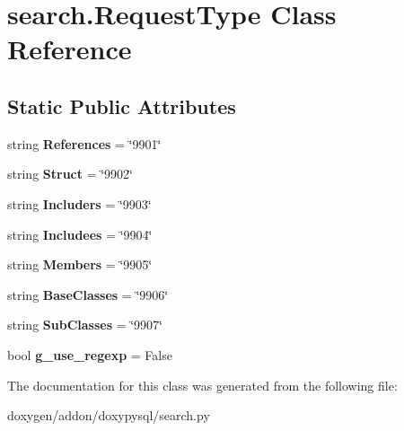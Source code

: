 \hypertarget{classsearch_1_1_request_type}{}\section{search.\+Request\+Type Class Reference}
\label{classsearch_1_1_request_type}
\subsection*{Static Public Attributes}
\begin{DoxyCompactItemize}
\item 
\mbox{\label{classsearch_1_1_request_type_ac366ecff13e29a1e9de0626e72a10e15}} 
string {\bfseries References} = \char`\"{}9901\char`\"{}
\item 
\mbox{\label{classsearch_1_1_request_type_a6db1aa20748192d736732e4f19b3a6f2}} 
string {\bfseries Struct} = \char`\"{}9902\char`\"{}
\item 
\mbox{\label{classsearch_1_1_request_type_adc2057e46c1a24a5fdc5f6b55e06b5e6}} 
string {\bfseries Includers} = \char`\"{}9903\char`\"{}
\item 
\mbox{\label{classsearch_1_1_request_type_a33ea51680ef2f9b512541dd64a2384b2}} 
string {\bfseries Includees} = \char`\"{}9904\char`\"{}
\item 
\mbox{\label{classsearch_1_1_request_type_a610b07848237d0ae74a6d2df7876db02}} 
string {\bfseries Members} = \char`\"{}9905\char`\"{}
\item 
\mbox{\label{classsearch_1_1_request_type_afff38a669aa416f1dbed3d5e892e59ff}} 
string {\bfseries Base\+Classes} = \char`\"{}9906\char`\"{}
\item 
\mbox{\label{classsearch_1_1_request_type_a9bab5f69fb129e5a373ee06284ce615b}} 
string {\bfseries Sub\+Classes} = \char`\"{}9907\char`\"{}
\item 
\mbox{\label{classsearch_1_1_request_type_ac627f100fac88ad5e9d4728cc3e64393}} 
bool {\bfseries g\+\_\+use\+\_\+regexp} = False
\end{DoxyCompactItemize}


The documentation for this class was generated from the following file\+:\begin{DoxyCompactItemize}
\item 
doxygen/addon/doxypysql/search.\+py\end{DoxyCompactItemize}
